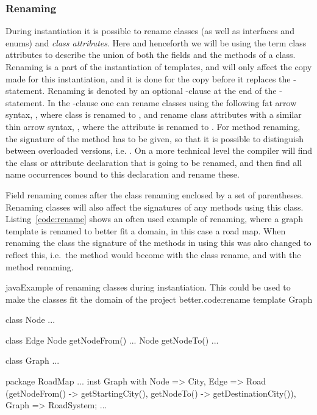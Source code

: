 \subsubsection{Renaming}\label{subsubsec:renaming}

During instantiation it is possible to rename classes (as well as interfaces and enums) and \textit{class attributes}.
Here and henceforth we will be using the term class attributes to describe the union of both the fields and the methods of a class.
Renaming is a part of the instantiation of templates, and will only affect the copy made for this instantiation, and it is done for the copy before it replaces the -statement.
Renaming is denoted by an optional -clause at the end of the -statement.
In the -clause one can rename classes using the following fat arrow syntax, , where class  is renamed to , and rename class attributes with a similar thin arrow syntax, , where the attribute  is renamed to .
For method renaming, the signature of the method has to be given, so that it is possible to distinguish between overloaded versions, i.e. .
On a more technical level the compiler will find the class or attribute declaration that is going to be renamed, and then find all name occurrences bound to this declaration and rename these.

Field renaming comes after the class renaming enclosed by a set of parentheses.
Renaming classes will also affect the signatures of any methods using this class.
Listing~\vref{code:rename} shows an often used example of renaming, where a graph template is renamed to better fit a domain, in this case a road map.
When renaming the class  the signature of the methods in  using this  was also changed to reflect this, i.e.\ the method  would become  with the class rename, and  with the method renaming.

\begin{code}{java}{Example of renaming classes during instantiation. This could be used to make the classes fit the domain of the project better.}{code:rename}
template Graph {
    class Node {
        ...
    }

    class Edge {
        Node getNodeFrom() { ... }
        Node getNodeTo() { ... }
    }

    class Graph {
        ...
    }
}

package RoadMap {
    ...
    inst Graph with
        Node => City,
        Edge => Road
            (getNodeFrom() -> getStartingCity(),
            getNodeTo() -> getDestinationCity()),
        Graph => RoadSystem;
    ...
}

\end{code}

